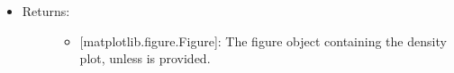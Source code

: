 \documentclass[letterpaper,10pt,english]{sphinxmanual}
\begin{document}
\begin{fulllineitems}
\begin{itemize}
\item {} \begin{description}
\item[{Returns:}] \leavevmode\begin{itemize}
\item {} 
{[}matplotlib.figure.Figure{]}: The figure object containing the
density plot, unless  is provided.

\end{itemize}

\end{description}

\end{itemize}

\end{fulllineitems}

\end{document}
